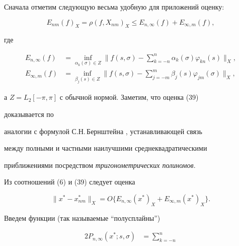 \begin{pf} 


Сначала отметим следующую весьма удобную для приложений оценку: 


\begin{equation} 


E_{nm}(f)_X=\rho(f,X_{nm})_X\le E_{n,\infty}(f)+ 


E_{\infty,m}(f), 


\end{equation} 


где 


\begin{align*} 


E_{n,\infty}(f)&=\inf_{\alpha_k(\sigma)\in Z}\bigg\| 


f(s,\sigma)-\sum^n_{k=-n}\alpha_k(\sigma)\varphi_{k n}(s) 


\bigg\|_X, \\ 


% 


E_{\infty,m}(f)&=\inf_{\beta_j(s)\in Z}\bigg\|f(s,\sigma)- 


\sum^m_{j=-m}\beta_j(s)\varphi_{j m}(\sigma)\bigg\|_X, 


\end{align*} 


а $Z=L_2[-\pi,\pi]$ с обычной нормой. Заметим, что оценка (39) 


доказывается по 


аналогии с формулой С.Н.\,Бернштейна \cite{13}, устанавливающей связь 


между полными и частными наилучшими среднеквадратическими 


приближениями посредством {\it тригонометрических полиномов}. 


 


Из соотношений (6) и (39) следует оценка 


\begin{equation} 


\|x^*-x^*_{nm}\|_X=O\{E_{n,\infty}(x^*)_X+ 


E_{\infty,m}(x^*)_X\}. 


\end{equation} 


Введем функции (так называемые ``полусплайны'') 


\begin{alignat}{2} 


P_{n,\infty}(x^*;s,\sigma)&=\sum^n_{k=-n} 



\end{alignat}
\end{pf}
